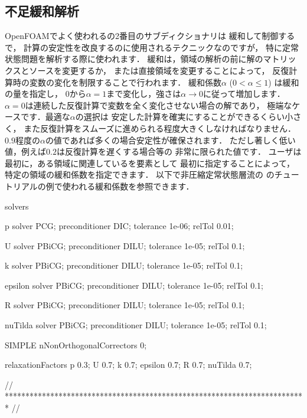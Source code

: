 \subsection{不足緩和解析}
\label{ssec:4.5.2}
OpenFOAMでよく使われるの2番目のサブディクショナリは
緩和して制御するで，
計算の安定性を改良するのに使用されるテクニックなのですが，
特に定常状態問題を解析する際に使われます．
緩和は，領域の解析の前に解のマトリックスとソースを変更するか，
または直接領域を変更することによって，
反復計算時の変数の変化を制限することで行われます．
緩和係数$\alpha$ ($0 < \alpha \le 1$) は緩和の量を指定し，
$0$から$\alpha = 1$まで変化し，強さは$\alpha \to 0$に従って増加します．
$\alpha = 0$は連続した反復計算で変数を全く変化させない場合の解であり，
極端なケースです．最適な$\alpha$の選択は
安定した計算を確実にすることができるくらい小さく，
また反復計算をスムーズに進められる程度大きくしなければなりません．
$0.9$程度の$\alpha$の値であれば多くの場合安定性が確保されます．
ただし著しく低い値，例えば$0.2$は反復計算を遅くする場合等の
非常に限られた値です．
ユーザは最初に，ある領域に関連しているを要素として
最初に指定することによって，特定の領域の緩和係数を指定できます．
以下で非圧縮定常状態層流の
のチュートリアルの例で使われる緩和係数を参照できます．
\begin{OFverbatim}[file, linenum=17]

solvers
{
    p
    {
        solver           PCG;
        preconditioner   DIC;
        tolerance        1e-06;
        relTol           0.01;
    }

    U
    {
        solver           PBiCG;
        preconditioner   DILU;
        tolerance        1e-05;
        relTol           0.1;
    }

    k
    {
        solver           PBiCG;
        preconditioner   DILU;
        tolerance        1e-05;
        relTol           0.1;
    }

    epsilon
    {
        solver           PBiCG;
        preconditioner   DILU;
        tolerance        1e-05;
        relTol           0.1;
    }

    R
    {
        solver           PBiCG;
        preconditioner   DILU;
        tolerance        1e-05;
        relTol           0.1;
    }

    nuTilda
    {
        solver           PBiCG;
        preconditioner   DILU;
        tolerance        1e-05;
        relTol           0.1;
    }
}

SIMPLE
{
    nNonOrthogonalCorrectors 0;
}

relaxationFactors
{
    p               0.3;
    U               0.7;
    k               0.7;
    epsilon         0.7;
    R               0.7;
    nuTilda         0.7;
}


// ************************************************************************* //
\end{OFverbatim}


